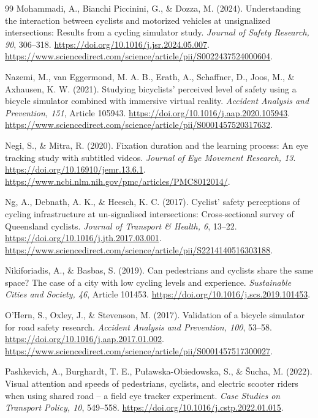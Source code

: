 \begin{thebibliography}{99}
Mohammadi, A., Bianchi Piccinini, G., \& Dozza, M. (2024). Understanding the
interaction between cyclists and motorized vehicles at unsignalized
intersections: Results from a cycling simulator study. \emph{Journal of Safety
Research, 90}, 306--318. \url{https://doi.org/10.1016/j.jsr.2024.05.007}.
\url{https://www.sciencedirect.com/science/article/pii/S0022437524000604}.

Nazemi, M., van Eggermond, M. A. B., Erath, A., Schaffner, D., Joos, M., \&
Axhausen, K. W. (2021). Studying bicyclists' perceived level of safety using a
bicycle simulator combined with immersive virtual reality. \emph{Accident
Analysis and Prevention, 151}, Article 105943.
\url{https://doi.org/10.1016/j.aap.2020.105943}.
\url{https://www.sciencedirect.com/science/article/pii/S0001457520317632}.

Negi, S., \& Mitra, R. (2020). Fixation duration and the learning process: An
eye tracking study with subtitled videos. \emph{Journal of Eye Movement
Research, 13}. \url{https://doi.org/10.16910/jemr.13.6.1}.
\url{https://www.ncbi.nlm.nih.gov/pmc/articles/PMC8012014/}.

Ng, A., Debnath, A. K., \& Heesch, K. C. (2017). Cyclist' safety perceptions of
cycling infrastructure at un-signalised intersections: Cross-sectional survey of
Queensland cyclists. \emph{Journal of Transport \& Health, 6}, 13--22.
\url{https://doi.org/10.1016/j.jth.2017.03.001}.
\url{https://www.sciencedirect.com/science/article/pii/S2214140516303188}.

Nikiforiadis, A., \& Basbas, S. (2019). Can pedestrians and cyclists share the
same space? The case of a city with low cycling levels and experience.
\emph{Sustainable Cities and Society, 46}, Article 101453.
\url{https://doi.org/10.1016/j.scs.2019.101453}.

O'Hern, S., Oxley, J., \& Stevenson, M. (2017). Validation of a bicycle
simulator for road safety research. \emph{Accident Analysis and Prevention,
100}, 53--58. \url{https://doi.org/10.1016/j.aap.2017.01.002}.
\url{https://www.sciencedirect.com/science/article/pii/S0001457517300027}.

Pashkevich, A., Burghardt, T. E., Puławska-Obiedowska, S., \& Šucha, M. (2022).
Visual attention and speeds of pedestrians, cyclists, and electric scooter
riders when using shared road -- a field eye tracker experiment. \emph{Case
Studies on Transport Policy, 10}, 549--558.
\url{https://doi.org/10.1016/j.cstp.2022.01.015}.


\end{thebibliography}
